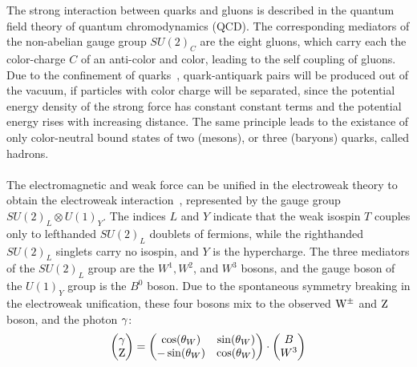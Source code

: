 The strong interaction between quarks and gluons is described in the quantum field theory of quantum chromodynamics (QCD). The corresponding mediators of the non-abelian gauge group $SU(2)_C$ are the eight gluons, which carry each the color-charge $C$ of an anti-color and color, leading to the self coupling of gluons. Due to the confinement of quarks~\cite{Confinement}, quark-antiquark pairs will be produced out of the vacuum, if particles with color charge will be separated, since the potential energy density of the strong force has constant constant terms and the potential energy rises with increasing distance. The same principle leads to the existance of only color-neutral bound states of two (mesons), or three (baryons) quarks, called hadrons.
\\\\
The electromagnetic and weak force can be unified in the electroweak theory to obtain the electroweak interaction~\cite{Weinberg,Weinberg2,Salam,Glashow}, represented by the gauge group $ SU(2)_L\otimes U(1)_Y$. The indices $L$ and $Y$ indicate that the weak isospin $T$ couples only to lefthanded $SU(2)_L$ doublets of fermions, while the righthanded $SU(2)_L$ singlets carry no isospin, and $Y$ is the hypercharge. The three mediators of the $SU(2)_L$ group are the $W^1,W^2$, and $W^3$ bosons, and the gauge boson of the $U(1)_Y$ group is the $B^0$ boson.
Due to the spontaneous symmetry breaking in the electroweak unification, these four bosons mix to the observed $\mathrm{W}^\pm$ and $\mathrm{Z}$ boson, and the photon $\gamma$:
\begin{equation}
  \left(
  \begin{matrix}
    \gamma \\
    \mathrm{Z}
  \end{matrix}
  \right)
  =
  \left(\begin{matrix}
  \cos(\theta_W) & \sin(\theta_W)\\
  -\sin(\theta_W) & \cos(\theta_W)
\end{matrix}\right)
\cdot
\left(
\begin{matrix}
  B \\
  W^3
\end{matrix}
\right)
\end{equation}

